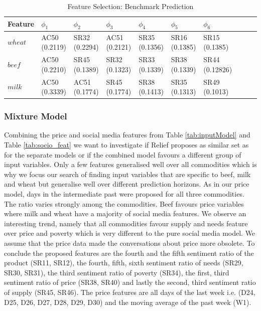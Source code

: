 \begin{table}[H]
\centering
\begin{tabular}{ |p{2cm}|p{1.5cm}|p{1.5cm}|p{1.5cm}|p{1.5cm}|p{1.5cm}|p{1.5cm}|p{1.5cm}|p{1.5cm}|p{15cm}| }
  \hline
 Feature &  $\phi_1$ &  $\phi_2$ &  $\phi_3$ &  $\phi_4$ &  $\phi_5$&  $\phi_6$    \\
 \hline

 $wheat$ & AC50 (0.2119)   & SR32 (0.2294)   & AC51 (0.2121) &  SR35 (0.1356)  & SR16 (0.1385) & SR15 (0.1385)\\
  \hline
  $beef$ & AC50 (0.2210) & SR45 (0.1389) & SR32 (0.1323) & SR33 (0.1339) & SR38 (0.1339) & SR44 (0.12826)  \\
  \hline
  $milk$ & AC50 (0.3339) & AC51 (0.1774) & SR45 (0.1774) & SR38 (0.1413) & SR35 (0.1313) & SR49 (0.1013)  \\

  \hline
 \end{tabular}
\caption{Feature Selection: Benchmark Prediction}
\label{tab:feat_mod2}
\end{table}



\subsubsection{Mixture Model}

Combining the price and social media features from Table \ref{tab:inputModel} and Table \ref{tab:socio_feat} we want to investigate if Relief proposes as similar set as for the separate models or if the combined model favours a different group of input variables. Only a few features generalised well over all commodities which is why we focus our search of finding input variables that are specific to beef, milk and wheat but generalise well over different prediction horizons. As in our price model, days in the intermediate past were proposed for all three commodities. The ratio varies strongly among the commodities. Beef favours price variables where milk and wheat have a majority of social media features. We observe an interesting trend, namely that all commodities favour supply and needs feature over price and poverty which is very different to the pure social media model. We assume that the price data made the conversations about price more obsolete. To conclude the proposed features are the fourth and the fifth sentiment ratio of the product (SR11, SR12), the fourth, fifth, sixth sentiment ratio of needs (SR29, SR30, SR31), the third sentiment ratio of poverty (SR34), the first, third sentiment ratio of price (SR38, SR40) and lastly the second, third sentiment ratio of supply (SR45, SR46). The price features are all days of the last week i.e. (D24, D25, D26, D27, D28, D29, D30) and the moving average of the past week (W1). 

